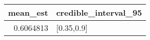 \begin{longtable}{rl}
\toprule
mean\_est & credible\_interval\_95 \\ 
\midrule
0.6064813 & [0.35,0.9] \\ 
\bottomrule
\end{longtable}

